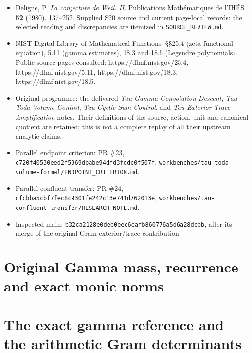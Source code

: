 \begin{itemize}
\tightlist
\item
  Deligne, P. \emph{La conjecture de Weil. II}. Publications Mathématiques de l'IHÉS \textbf{52} (1980), 137--252. Supplied S20 source and current page-local records; the selected reading and discrepancies are itemized in \nolinkurl{SOURCE_REVIEW.md}.
\item
  NIST Digital Library of Mathematical Functions: §§25.4 (zeta functional equation), 5.11 (gamma estimates), 18.3 and 18.5 (Legendre polynomials). Public source pages consulted: https://dlmf.nist.gov/25.4, https://dlmf.nist.gov/5.11, https://dlmf.nist.gov/18.3, https://dlmf.nist.gov/18.5.
\item
  Original programme: the delivered \emph{Tau Gamma Convolution Descent}, \emph{Tau Toda Volume Control}, \emph{Tau Cyclic Sum Control}, and \emph{Tau Exterior Trace Amplification} notes. Their definitions of the source, action, unit and canonical quotient are retained; this is not a complete replay of all their upstream analytic claims.
\item
  Parallel endpoint criterion: PR \#23, \nolinkurl{c720f40530eed2f5969dbabe94dfd3fddc0f507f}, \nolinkurl{workbenches/tau-toda-volume-formal/ENDPOINT_CRITERION.md}.
\item
  Parallel confluent transfer: PR \#24, \nolinkurl{dfcbba5cbf7fec8c9301fe242c13e741d762013e}, \nolinkurl{workbenches/tau-confluent-transfer/RESEARCH_NOTE.md}.
\item
  Inspected main: \nolinkurl{b32ca2128e0deb0eec6eafb860776a5d6a28dcbb}, after its merge of the original-Gram exterior/trace contribution.
\end{itemize}

\endgroup

\clearpage
\begingroup


\setcounter{equation}{0}
\renewcommand{\theequation}{TGR.\arabic{equation}}
\section*{Original Gamma mass, recurrence and exact monic norms}
\section{The exact gamma reference and the arithmetic Gram determinants}
\label{tgr:sec:theta-gamma-reference}

